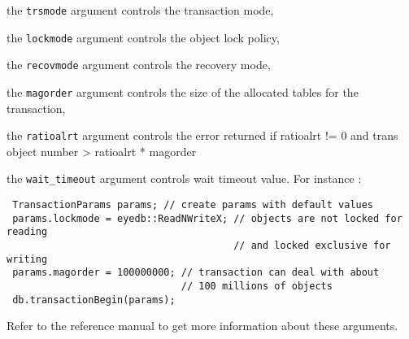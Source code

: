 \be
\item the \texttt{trsmode} argument controls the transaction mode,
\item the \texttt{lockmode} argument controls the object lock policy,
\item the \texttt{recovmode} argument controls the recovery mode,
\item the \texttt{magorder} argument controls the size of the allocated
tables for the transaction,
\item the \texttt{ratioalrt} argument controls the  error returned if
ratioalrt != 0 and trans object number > ratioalrt * magorder
\item the \texttt{wait\_timeout} argument controls 
wait timeout value.
\ee
For instance :
\begin{verbatim}
 TransactionParams params; // create params with default values
 params.lockmode = eyedb::ReadNWriteX; // objects are not locked for reading
                                       // and locked exclusive for writing
 params.magorder = 100000000; // transaction can deal with about
                              // 100 millions of objects
 db.transactionBegin(params);
\end{verbatim}
Refer to the reference manual to get more information about these arguments.

